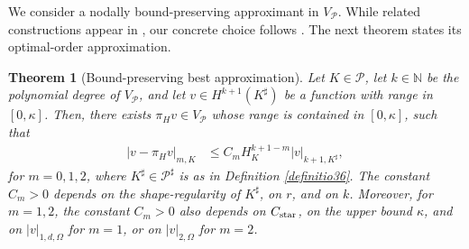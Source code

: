 \documentclass[11pt,final]{amsart}
\theoremstyle{plain}
\newtheorem{theorem}{Theorem}[section]
\theoremstyle{definition}
\newcommand\calP{{\mathcal{P}}}
\newcommand{\mesh}{\calP}
\newcommand{\meshsh}{\calP^{\sharp}}
\renewcommand{\k}{K}
\newcommand{\ksh}{{K^{\sharp}}}
\begin{document}
We consider a nodally bound-preserving approximant in
$V_{\mesh}$. While related constructions appear in
\cite{mosco1974one,strang2006dimension,ashby2024duality}, our concrete
choice follows \cite{Kirby4755186}. The next theorem states its
optimal-order approximation.

\begin{theorem}[Bound-preserving best approximation]
  \label{theorembound12}
  Let $\k \in\calP$, let $k\in\mathbb{N}$ be the polynomial degree of
  $V_\mesh$, and let $v\in H^{k+1}(\ksh)$ be a function with range in
  $[0, \kappa]$.  Then, there exists $\pi_{H}v \in V_\calP$ whose
  range is contained in $[0, \kappa]$, such that
  \begin{align}
    |v - \pi_{H}v|_{m,\k} &\leq C_mH_{\k}^{k+1-m} |v|_{k+1,\ksh},\label{123456}
  \end{align}
  for $m=0,1,2$, where $\ksh\in\meshsh$ is as in Definition
  \ref{definitio36}. The constant $C_m>0$ depends on the
  shape-regularity of $\ksh$, on $r$, and on $k$. Moreover, for
  $m=1,2$, the constant $C_m>0$ also depends on $C_{\rm star}$, on the
  upper bound $\kappa$, and on $|v|_{1,d,\Omega}$ for $m=1$, or on
  $|v|_{2,\Omega}$ for $m=2$.
\end{theorem}
\end{document}
